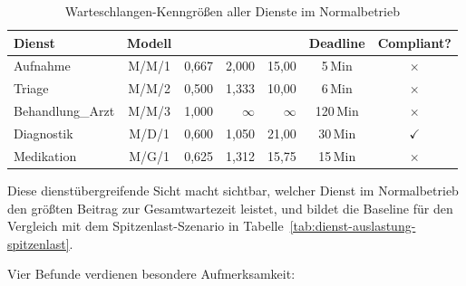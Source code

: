 ﻿\documentclass[a4paper,12pt]{report}
\theoremstyle{definition}
\begin{document}
\begin{table}[H]
	\centering
	\begin{tabular}{@{}lcrrrcc@{}}
		\toprule
		\textbf{Dienst} & \textbf{Modell} & \boldmath{$\rho$} &
		\boldmath{$L$} & \boldmath{$W$ (Min)} & \textbf{Deadline} & \textbf{Compliant?} \\
		\midrule
		Aufnahme        & M/M/1 & 0{,}667 & 2{,}000 &  15{,}00 & 5\,Min   & $\times$ \\
		Triage          & M/M/2 & 0{,}500 & 1{,}333 &  10{,}00 & 6\,Min   & $\times$ \\
		Behandlung\_Arzt& M/M/3 & 1{,}000 & $\infty$& $\infty$ & 120\,Min & $\times$ \\
		Diagnostik      & M/D/1 & 0{,}600 & 1{,}050 &  21{,}00 & 30\,Min  & $\checkmark$ \\
		Medikation      & M/G/1 & 0{,}625 & 1{,}312 &  15{,}75 & 15\,Min  & $\times$ \\
		\bottomrule
	\end{tabular}
	\caption{Warteschlangen-Kenngrößen aller Dienste im Normalbetrieb}
\label{tab:queue-alle-dienste}
	\label{tab:wq-auswertung-normal}
\end{table}

Diese dienstübergreifende Sicht macht sichtbar, welcher Dienst im Normalbetrieb den größten Beitrag zur Gesamtwartezeit leistet, und bildet die Baseline für den Vergleich mit dem Spitzenlast-Szenario in Tabelle~\ref{tab:dienst-auslastung-spitzenlast}.

Vier Befunde verdienen besondere Aufmerksamkeit:
\end{document}
